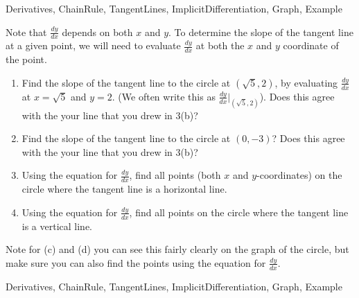 \begin{tagblock}{Derivatives, ChainRule, TangentLines, ImplicitDifferentiation, Graph, Example}
\begin{question}
\begin{enumerate}
Note that $\frac{dy}{dx}$ depends on both $x$ and $y$.  To determine the slope of the tangent line at a given point, we will need to evaluate $\frac{dy}{dx}$ at both the $x$ and $y$ coordinate of the point.
\begin{enumerate}
\item Find the slope of the tangent line to the circle at $(\sqrt{5},2)$, by evaluating $\frac{dy}{dx}$ at $x=\sqrt{5}$ and $y=2$.  (We often write this as $\frac{dy}{dx}|_{(\sqrt{5},2)}$).  Does this agree with the your line that you drew in 3(b)?
\vspace{.5in}


\item Find the slope of the tangent line to the circle at $(0,-3)$?  Does this agree with the your line that you drew in 3(b)?
\vspace{.5in}

\item Using the equation for $\frac{dy}{dx}$, find all points (both $x$ and $y$-coordinates) on the circle where the tangent line is a horizontal line.  
\vspace{1in}


\item Using the equation for $\frac{dy}{dx}$, find all points on the circle where the tangent line is a vertical line.
\end{enumerate}

\vfill
Note for (c) and (d) you can see this fairly clearly on the graph of the circle, but make sure you can also find the points using the equation for $\frac{dy}{dx}$.  

\end{enumerate}


	
\begin{tags}
	    Derivatives, ChainRule, TangentLines, ImplicitDifferentiation, Graph, Example
\end{tags}
	
\begin{diary}
\end{diary}
	
\begin{solution}
	   
\end{solution}
	
\end{question}

\end{tagblock}

